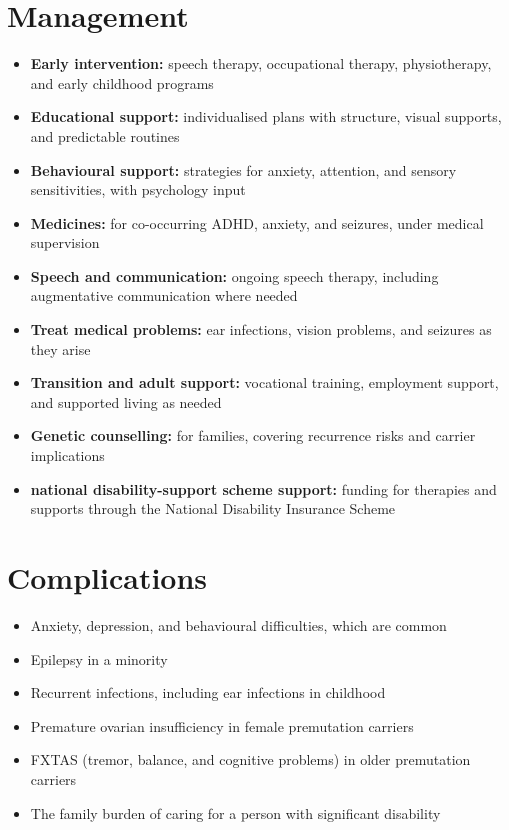 \section*{Management}
\begin{itemize}
    \item \textbf{Early intervention:} speech therapy, occupational therapy, physiotherapy, and early childhood programs
    \item \textbf{Educational support:} individualised plans with structure, visual supports, and predictable routines
    \item \textbf{Behavioural support:} strategies for anxiety, attention, and sensory sensitivities, with psychology input
    \item \textbf{Medicines:} for co-occurring ADHD, anxiety, and seizures, under medical supervision
    \item \textbf{Speech and communication:} ongoing speech therapy, including augmentative communication where needed
    \item \textbf{Treat medical problems:} ear infections, vision problems, and seizures as they arise
    \item \textbf{Transition and adult support:} vocational training, employment support, and supported living as needed
    \item \textbf{Genetic counselling:} for families, covering recurrence risks and carrier implications
    \item \textbf{national disability-support scheme support:} funding for therapies and supports through the National Disability Insurance Scheme
\end{itemize}

\section*{Complications}
\begin{itemize}
    \item Anxiety, depression, and behavioural difficulties, which are common
    \item Epilepsy in a minority
    \item Recurrent infections, including ear infections in childhood
    \item Premature ovarian insufficiency in female premutation carriers
    \item FXTAS (tremor, balance, and cognitive problems) in older premutation carriers
    \item The family burden of caring for a person with significant disability
\end{itemize}

